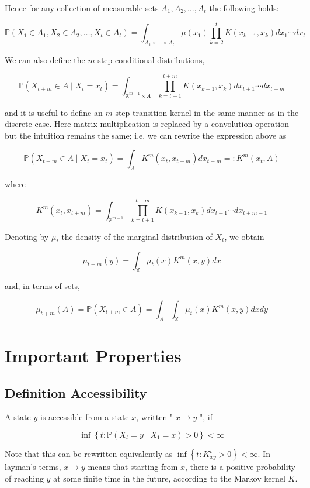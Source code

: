 \documentclass[10pt]{article}
\begin{document}
Hence for any collection of measurable sets $A_{1}, A_{2}, \ldots, A_{t}$ the following holds:

$$
\mathbb{P}\left(X_{1} \in A_{1}, X_{2} \in A_{2}, \ldots, X_{t} \in A_{t}\right)=\int_{A_{1} \times \cdots \times A_{t}} \mu\left(x_{1}\right) \prod_{k=2}^{t} K\left(x_{k-1}, x_{k}\right) d x_{1} \cdots d x_{t}
$$

We can also define the $m$-step conditional distributions,

$$
\mathbb{P}\left(X_{t+m} \in A \mid X_{t}=x_{t}\right)=\int_{\mathbb{X}^{m-1} \times A} \prod_{k=t+1}^{t+m} K\left(x_{k-1}, x_{k}\right) d x_{t+1} \cdots d x_{t+m}
$$

and it is useful to define an $m$-step transition kernel in the same manner as in the discrete case. Here matrix multiplication is replaced by a convolution operation but the intuition remains the same; i.e. we can rewrite the expression above as

$$
\mathbb{P}\left(X_{t+m} \in A \mid X_{t}=x_{t}\right)=\int_{A} K^{m}\left(x_{t}, x_{t+m}\right) d x_{t+m}=: K^{m}\left(x_{t}, A\right)
$$

where

$$
K^{m}\left(x_{t}, x_{t+m}\right)=\int_{\mathbb{X}^{m-1}} \prod_{k=t+1}^{t+m} K\left(x_{k-1}, x_{k}\right) d x_{t+1} \cdots d x_{t+m-1}
$$

Denoting by $\mu_{t}$ the density of the marginal distribution of $X_{t}$, we obtain

$$
\mu_{t+m}(y)=\int_{\mathbb{X}} \mu_{t}(x) K^{m}(x, y) d x
$$

and, in terms of sets,

$$
\mu_{t+m}(A)=\mathbb{P}\left(X_{t+m} \in A\right)=\int_{A} \int_{\mathbb{X}} \mu_{t}(x) K^{m}(x, y) d x d y
$$


\section{Important Properties}
\subsection{Definition Accessibility}
A state $y$ is accessible from a state $x$, written " $x \rightarrow y$ ", if

$$
\inf \left\{t: \mathbb{P}\left(X_{t}=y \mid X_{1}=x\right)>0\right\}<\infty
$$

Note that this can be rewritten equivalently as $\inf \left\{t: K_{x y}^{t}>0\right\}<\infty$. In layman's terms, $x \rightarrow y$ means that starting from $x$, there is a positive probability of reaching $y$ at some finite time in the future, according to the Markov kernel $K$.
\end{document}
